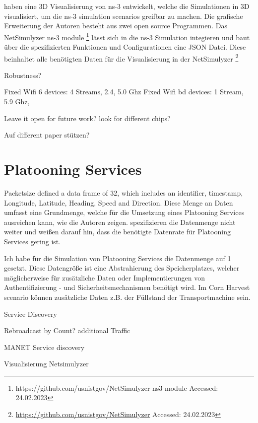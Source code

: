 \documentclass[]{nsm-thesis}
\begin{document}
\textcite{black_netsimulyzer_2021} haben eine 3D Visualisierung von ns-3 entwickelt, welche die Simulationen in 3D visualisiert, um die ns-3 simulation
scenarios greifbar zu machen. Die grafische Erweiterung der Autoren besteht aus zwei open source Programmen. Das 
NetSimulyzer ns-3 module \footnote{https://github.com/usnistgov/NetSimulyzer-ns3-module Accessed: 24.02.2023} lässt sich in die ns-3 Simulation integieren und baut über die spezifizierten Funktionen und Configurationen
eine JSON Datei. Diese beinhaltet alle benötigten Daten für die Visualisierung in der NetSimulyzer \footnote{\url{https://github.com/usnistgov/NetSimulyzer} Accessed: 24.02.2023}


Robustness?





Fixed Wifi 6 devices: 4 Streams, 2.4, 5.0 Ghz
Fixed Wifi bd devices: 1 Stream, 5.9 Ghz, 

Leave it open for future work?
look for different chips?

Auf different paper stützen? 


\section{Platooning Services}

Packetsize 
\textcite{zhang_method_2009} defined a data frame of \SI{32}{\byte}, which includes an identifier, timestamp, Longitude, Latitude, Heading, Speed and Direction.
Diese Menge an Daten umfasst eine Grundmenge, welche für die Umsetzung eines Platooning Services ausreichen kann, wie die Autoren zeigen.
\textcite{schlingmann_aef_2019} spezifizieren die Datenmenge nicht weiter und weißen darauf hin, dass die benötigte Datenrate für Platooning Services gering ist.

Ich habe für die Simulation von Platooning Services die Datenmenge auf \SI{1}{\kilo\byte} gesetzt. Diese Datengröße ist eine Abstrahierung des Speicherplatzes, welcher möglicherweise für zusätzliche Daten oder Implementierungen von Authentifizierung -  und Sicherheitsmechanismen benötigt wird. Im Corn Harvest scenario können zusätzliche Daten z.B. der Füllstand der Transportmachine sein. 


Service Discovery

Rebroadcast by Count?
additional Traffic

MANET Service discovery

Visualisierung Netsimulyzer
\end{document}
